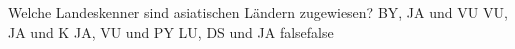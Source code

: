     {Welche Landeskenner sind asiatischen Ländern zugewiesen?}
    {BY, JA und VU}
    {VU, JA und K}
    {JA, VU und PY}
    {LU, DS und JA}
    {false}{false}